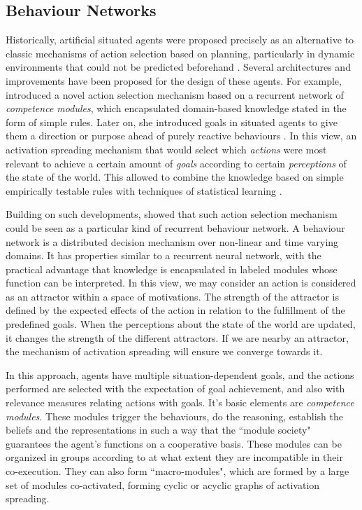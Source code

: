 \documentclass[
		twoside,openright,titlepage,numbers=noenddot,manychapters,
		headinclude,%
                footinclude=false,cleardoublepage=empty,
                BCOR=5mm,
		fontsize=11pt, %
                 enabledeprecatedfontcommands]{scrreprt}
\begin{document}
\subsection{Behaviour Networks}
Historically, artificial situated agents were proposed precisely as an alternative to classic mechanisms of action selection based on planning, particularly in dynamic environments that could not be predicted beforehand \cite[]{Brooks1990}. Several architectures and improvements have been proposed for the design of these agents. For example, \cite{Maes1989} introduced a novel action selection mechanism based on a recurrent network of \emph{competence modules}, which encapsulated domain-based knowledge stated in the form of simple rules. Later on, she introduced goals in situated agents to give them a direction or purpose ahead of purely reactive behaviours \cite[]{Maes1990}. In this view, an activation spreading mechanism that would select which \emph{actions} were most relevant to achieve a certain amount of \emph{goals} according to certain \emph{perceptions} of the state of the world. This allowed to combine the knowledge based on simple empirically testable rules with techniques of statistical learning \cite[]{maes1991ana}.

Building on such developments, \cite{goetz1998arb} showed that such action selection mechanism could be seen as a particular kind of recurrent behaviour network. A behaviour network is a distributed decision mechanism over non-linear and time varying domains. It has properties similar to a recurrent neural network, with the practical advantage that knowledge is encapsulated in labeled modules whose function can be interpreted. In this view, we may consider an action is considered as an attractor within a space of motivations. The strength of the attractor is defined by the expected effects of the action in relation to the fulfillment of the predefined goals. When the perceptions about the state of the world are updated, it changes the strength of the different attractors. If we are nearby an attractor, the mechanism of activation spreading will ensure we converge towards it.

 In this approach, agents have multiple situation-dependent goals, and the actions performed are selected with the expectation of goal achievement, and also with relevance measures relating actions with goals. It's basic elements are \emph{competence modules}. These modules trigger the behaviours, do the reasoning, establish the beliefs and the representations in such a way that the ``module society" guarantees the agent's functions on a cooperative basis. These modules can be organized in groups according to at what extent they are incompatible in their co-execution. They can also form ``macro-modules", which are formed by a large set of modules co-activated, forming cyclic or acyclic graphs of activation spreading.
\end{document}
